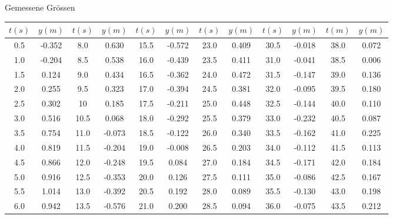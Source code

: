\begin{center}
    \begin{threeparttable}
        \caption{Gemessene Gr\"ossen}
        \begin{tabular}{*{12}{c}}
            \toprule
            $t(s)$  &  $y(m)$   &  $t(s)$   &  $y(m)$   &  $t(s)$  &  $y(m)$    &  $t(s)$   & $y(m)$    &  $t(s)$   &  $y(m)$   &  $t(m)$   &  $y(m)$ \\
            \midrule
            0.5     & -0.352    & 8.0       & 0.630     & 15.5     & -0.572     & 23.0      & 0.409    & 30.5       & -0.018    & 38.0      & 0.072   \\
            1.0     & -0.204    & 8.5       & 0.538     & 16.0     & -0.439     & 23.5      & 0.411    & 31.0       & -0.041    & 38.5      & 0.006   \\
            1.5     & 0.124     & 9.0       & 0.434     & 16.5     & -0.362     & 24.0      & 0.472    & 31.5       & -0.147    & 39.0      & 0.136   \\
            2.0     & 0.255     & 9.5       & 0.323     & 17.0     & -0.394     & 24.5      & 0.381    & 32.0       & -0.095    & 39.5      & 0.180   \\
            2.5     & 0.302     & 10        & 0.185     & 17.5     & -0.211     & 25.0      & 0.448    & 32.5       & -0.144    & 40.0      & 0.110   \\
            3.0     & 0.516     & 10.5      & 0.068     & 18.0     & -0.292     & 25.5      & 0.379    & 33.0       & -0.232    & 40.5      & 0.087   \\
            3.5     & 0.754     & 11.0      & -0.073    & 18.5     & -0.122     & 26.0      & 0.340    & 33.5       & -0.162    & 41.0      & 0.225   \\
            4.0     & 0.819     & 11.5      & -0.204    & 19.0     & -0.008     & 26.5      & 0.203    & 34.0       & -0.112    & 41.5      & 0.113   \\
            4.5     & 0.866     & 12.0      & -0.248    & 19.5     & 0.084      & 27.0      & 0.184    & 34.5       & -0.171    & 42.0      & 0.184   \\
            5.0     & 0.916     & 12.5      & -0.353    & 20.0     & 0.126      & 27.5      & 0.111    & 35.0       & -0.086    & 42.5      & 0.167   \\
            5.5     & 1.014     & 13.0      & -0.392    & 20.5     & 0.192      & 28.0      & 0.089    & 35.5       & -0.130    & 43.0      & 0.198   \\
            6.0     & 0.942     & 13.5      & -0.576    & 21.0     & 0.200      & 28.5      & 0.094    & 36.0       & -0.075    & 43.5      & 0.212   \\

\end{tabular}
\end{threeparttable}
\end{center}
